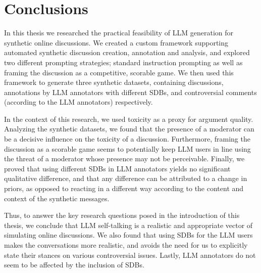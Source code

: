 %
\chapter{Conclusions}
\label{sec:conclusions}

In this thesis we researched the practical feasibility of LLM generation for synthetic online discussions. We created a custom framework supporting automated synthetic discussion creation, annotation and analysis, and explored two different prompting strategies; standard instruction prompting as well as framing the discussion as a competitive, scorable game. We then used this framework to generate three synthetic datasets, containing discussions, annotations by LLM annotators with different SDBs, and controversial comments (according to the LLM annotators) respectively. 

In the context of this research, we used toxicity as a proxy for argument quality. Analyzing the synthetic datasets, we found that the presence of a moderator can be a decisive influence on the toxicity of a discussion. Furthermore, framing the discussion as a scorable game seems to potentially keep LLM users in line using the threat of a moderator whose presence may not be perceivable. Finally, we proved that using different SDBs in LLM annotators yields no significant qualitative difference, and that any difference can be attributed to a change in priors, as opposed to reacting in a different way according to the content and context of the synthetic messages.

Thus, to answer the key research questions posed in the introduction of this thesis, we conclude that LLM self-talking is a realistic and appropriate vector of simulating online discussions. We also found that using SDBs for the LLM users makes the conversations more realistic, and avoids the need for us to explicitly state their stances on various controversial issues. Lastly, LLM annotators do not seem to be affected by the inclusion of SDBs.

